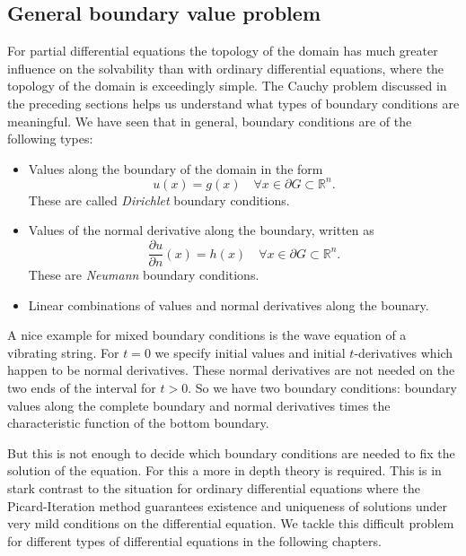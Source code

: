 \subsection{General boundary value problem
\label{klassifikation:allgemeines-randwertproblem}}
For partial differential equations the topology of the domain has much
greater influence on the solvability than with ordinary differential
equations, where the topology of the domain is exceedingly simple.
The Cauchy problem discussed in the preceding sections helps us understand
what types of boundary conditions are meaningful.
We have seen that in general, boundary conditions are of the following types:
\begin{itemize}
\item
Values along the boundary of the domain in the form
\[
u(x)=g(x)\quad \forall x\in\partial G\subset \mathbb R^n.
\]
These are called {\em Dirichlet} boundary conditions.
\item
Values of the normal derivative along the boundary, written as
\[
\frac{\partial u}{\partial n}(x)=h(x)\quad\forall x\in\partial G\subset \mathbb R^n.
\]
These are {\em Neumann} boundary conditions.
\item
Linear combinations of values and normal derivatives along the 
bounary.
\end{itemize}
A nice example for mixed boundary conditions is the wave equation of
a vibrating string.
For $t=0$ we specify initial values and initial $t$-derivatives which happen
to be normal derivatives.
These normal derivatives are not needed on the two ends of the interval
for $t>0$.
So we have two boundary conditions: boundary values along the complete
boundary and normal derivatives times the characteristic function of
the bottom boundary.

But this is not enough to decide which boundary conditions are needed
to fix the solution of the equation.
For this a more in depth theory is required.
This is in stark contrast to the situation for ordinary differential
equations where the Picard-Iteration method guarantees existence and
uniqueness of solutions under very mild conditions on the differential
equation.
We tackle this difficult problem for different types of differential
equations in the following chapters.

